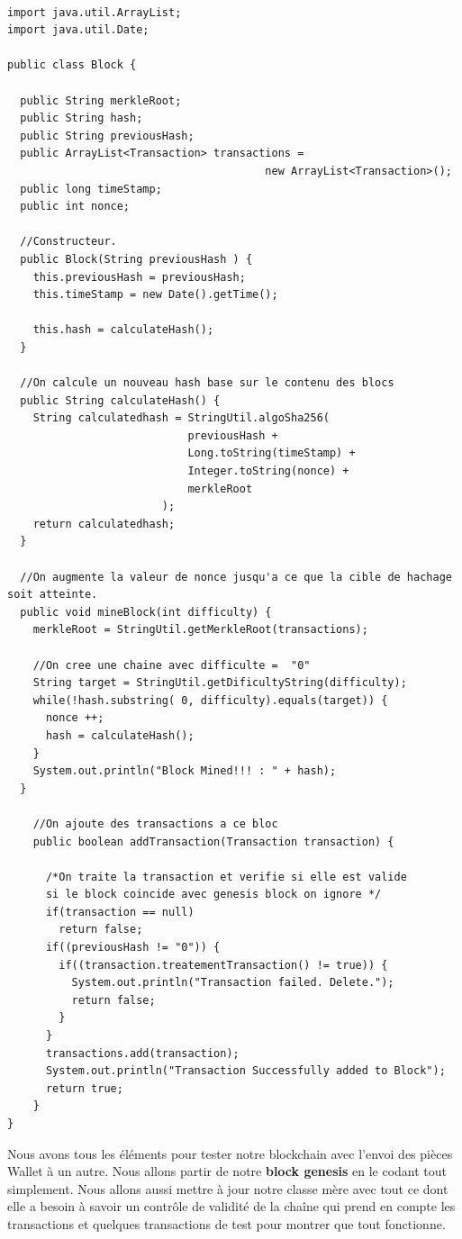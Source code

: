 \documentclass[12pt]{report}
\begin{document}
\begin{lstlisting}

import java.util.ArrayList;
import java.util.Date;

public class Block {
	
  public String merkleRoot;
  public String hash;
  public String previousHash;  
  public ArrayList<Transaction> transactions = 
                                        new ArrayList<Transaction>(); 
  public long timeStamp;
  public int nonce;
	
  //Constructeur.  
  public Block(String previousHash ) {
    this.previousHash = previousHash;
    this.timeStamp = new Date().getTime();
		
    this.hash = calculateHash();
  }
	
  //On calcule un nouveau hash base sur le contenu des blocs
  public String calculateHash() {
    String calculatedhash = StringUtil.algoSha256( 
                            previousHash +
                            Long.toString(timeStamp) +
                            Integer.toString(nonce) + 
                            merkleRoot
                        );
    return calculatedhash;
  }
	
  //On augmente la valeur de nonce jusqu'a ce que la cible de hachage soit atteinte.
  public void mineBlock(int difficulty) {
    merkleRoot = StringUtil.getMerkleRoot(transactions);
    
    //On cree une chaine avec difficulte =  "0"
	String target = StringUtil.getDificultyString(difficulty); 
    while(!hash.substring( 0, difficulty).equals(target)) {
      nonce ++;
      hash = calculateHash();
    }
    System.out.println("Block Mined!!! : " + hash);
  }
	
    //On ajoute des transactions a ce bloc
    public boolean addTransaction(Transaction transaction) {
    
      /*On traite la transaction et verifie si elle est valide
      si le block coincide avec genesis block on ignore */
      if(transaction == null) 
        return false;	
      if((previousHash != "0")) {
        if((transaction.treatementTransaction() != true)) {
          System.out.println("Transaction failed. Delete.");
          return false;
        }
      }
      transactions.add(transaction);
      System.out.println("Transaction Successfully added to Block");
      return true;
    }
}
\end{lstlisting}

\hspace{1cm}Nous avons tous les éléments pour tester notre blockchain avec l'envoi des pièces Wallet à un autre. Nous allons partir de notre \textbf{block genesis} en le codant tout simplement. Nous allons aussi mettre à jour notre classe mère avec tout ce dont elle a besoin à savoir un contrôle de validité de la chaîne qui prend en compte les transactions et quelques transactions de test pour montrer que tout fonctionne.
\end{document}
